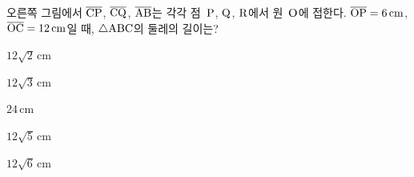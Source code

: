 \noindent\begin{minipage}[t]{0.58\linewidth}\vspace{0pt}\raggedright 오른쪽 그림에서 $\overline{\mathrm{CP}}$, $\overline{\mathrm{CQ}}$, $\overline{\mathrm{AB}}$는 각각 점~$\mathrm{P}$, $\mathrm{Q}$, $\mathrm{R}$에서 원~$\mathrm{O}$에 접한다. $\overline{\mathrm{OP}}=6\,\mathrm{cm}$, $\overline{\mathrm{OC}}=12\,\mathrm{cm}$일 때, $\triangle\mathrm{ABC}$의 둘레의 길이는?\end{minipage}\hfill\begin{minipage}[t]{0.4\linewidth}\vspace{0pt}\centering \resizebox{\ifdim\width>\linewidth\linewidth\else\width\fi}{!}{}\end{minipage}\par
\begin{choices32}{\rule[-3ex]{0pt}{8ex}$12\sqrt{2}\,\mathrm{cm}$}{\rule[-3ex]{0pt}{8ex}$12\sqrt{3}\,\mathrm{cm}$}{\rule[-3ex]{0pt}{8ex}$24\,\mathrm{cm}$}{\rule[-3ex]{0pt}{8ex}$12\sqrt{5}\,\mathrm{cm}$}{\rule[-3ex]{0pt}{8ex}$12\sqrt{6}\,\mathrm{cm}$}\end{choices32}
